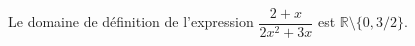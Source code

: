 Le domaine de définition de l'expression $\dfrac{2+x}{2x^2+3x}$ est $\mathbb R \setminus \{0,3/2\}$.

\begin{reponses}
\end{reponses}

